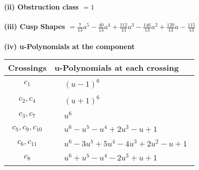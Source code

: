 \documentclass[1p]{elsarticle_modified}
\theoremstyle{definition}
\begin{document}
\flushleft \textbf{(ii) Obstruction class $= 1$}\\~\\
\flushleft \textbf{(iii) Cusp Shapes $= \frac{7}{13} a^5-\frac{40}{13} a^4+\frac{112}{13} a^3-\frac{146}{13} a^2+\frac{120}{13} a-\frac{115}{13}$}\\~\\
\newpage\renewcommand{\arraystretch}{1}
\flushleft \textbf{(iv) u-Polynomials at the component}\newline \\
\begin{tabular}{m{50pt}|m{274pt}}
Crossings & \hspace{64pt}u-Polynomials at each crossing \\
\hline $$\begin{aligned}c_{1}\end{aligned}$$&$\begin{aligned}
&(u-1)^6
\end{aligned}$\\
\hline $$\begin{aligned}c_{2},c_{4}\end{aligned}$$&$\begin{aligned}
&(u+1)^6
\end{aligned}$\\
\hline $$\begin{aligned}c_{3},c_{7}\end{aligned}$$&$\begin{aligned}
&u^6
\end{aligned}$\\
\hline $$\begin{aligned}c_{5},c_{9},c_{10}\end{aligned}$$&$\begin{aligned}
&u^6- u^5- u^4+2 u^3- u+1
\end{aligned}$\\
\hline $$\begin{aligned}c_{6},c_{11}\end{aligned}$$&$\begin{aligned}
&u^6-3 u^5+5 u^4-4 u^3+2 u^2- u+1
\end{aligned}$\\
\hline $$\begin{aligned}c_{8}\end{aligned}$$&$\begin{aligned}
&u^6+u^5- u^4-2 u^3+u+1
\end{aligned}$\\
\hline
\end{tabular}\\~\\
\end{document}
